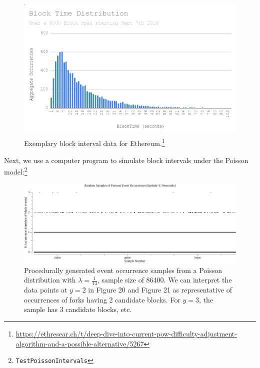 \documentclass[11pt]{article}
\theoremstyle{plain}
\begin{document}
\begin{figure}[tph]
    \centering

\includegraphics[width=1.0\textwidth]{vis_data_blockinterval_distribution.png}
    \caption{
      Exemplary block interval data for
Ethereum.\footnote{\url{https://ethresear.ch/t/deep-dive-into-current-pow-difficulty-adjustment-algorithm-and-a-possible-alternative/5267}}
    }
\end{figure}

Next, we use a computer program to simulate block intervals under the Poisson
model:\footnote{\texttt{TestPoissonIntervals}}

\begin{figure}[tph]
    \label{vis_poisson_samples_events_86400}
    \centering
    \includegraphics[width=1.0\textwidth]{go-block-step/out/vis_poisson_samples_events_86400.png}
    \caption{
        Procedurally generated event occurrence samples from a Poisson distribution
        with $\lambda = \frac{1}{14}$, sample size of 86400.
        We can interpret the data points at $y=2$ in Figure 20 and Figure 21 as
        representative of occurrences of forks having 2 candidate blocks.
        For $y=3$, the sample has 3 candidate blocks, etc.
    }
\end{figure}
\end{document}
